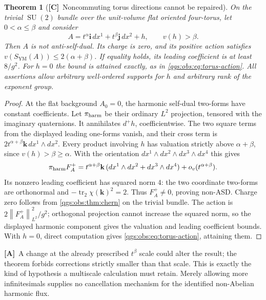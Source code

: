 \documentclass[11pt,oneside]{article}
\numberwithin{equation}{section}
\theoremstyle{plain}
\newtheorem{theorem}{Theorem}[section]
\theoremstyle{definition}
\theoremstyle{remark}
\newcommand{\qi}{\mathbf i}
\newcommand{\qj}{\mathbf j}
\newcommand{\qk}{\mathbf k}
\newcommand{\SYM}{S_{\mathrm{YM}}}
\DeclareMathOperator{\tr}{tr}
\DeclareMathOperator{\SU}{SU}
\newcommand{\norm}[1]{\left\|#1\right\|}
\newcommand{\TC}{\textcolor{TierC}{\textsf{\bfseries[C]}}}
\newcommand{\TA}{\textcolor{TierA}{\textsf{\bfseries[A]}}}
\begin{document}
\begin{theorem}[\TC\ Noncommuting torus directions cannot be repaired]\label{qgs:obs:thm:torus-obstruction}
On the trivial $\SU(2)$ bundle over the unit-volume flat oriented four-torus, let $0<\alpha\le\beta$ and consider
\begin{equation}\label{qgs:obs:eq:torus-tail}
 A=t^\alpha \qi\,dx^1+t^\beta \qj\,dx^2+h,
 \qquad v(h)>\beta.
\end{equation}
Then $A$ is not anti-self-dual. Its charge is zero, and its positive action satisfies $v(\SYM(A))\le2(\alpha+\beta)$. If equality holds, its leading coefficient is at least $8/g^2$. For $h=0$ the bound is attained exactly, as in \eqref{qgs:obs:eq:torus-action}. All assertions allow arbitrary well-ordered supports for $h$ and arbitrary rank of the exponent group.
\end{theorem}
\begin{proof}
At the flat background $A_0=0$, the harmonic self-dual two-forms have constant coefficients. Let $\pi_{\rm harm}$ be their ordinary $L^2$ projection, tensored with the imaginary quaternions. It annihilates $d^+h$, coefficientwise. The two square terms from the displayed leading one-forms vanish, and their cross term is $2t^{\alpha+\beta}\qk\,dx^1\wedge dx^2$. Every product involving $h$ has valuation strictly above $\alpha+\beta$, since $v(h)>\beta\ge\alpha$. With the orientation $dx^1\wedge dx^2\wedge dx^3\wedge dx^4$ this gives
\begin{equation}
 \pi_{\rm harm}F_A^+
 =t^{\alpha+\beta}\qk\,(dx^1\wedge dx^2+dx^3\wedge dx^4)
       +o_v(t^{\alpha+\beta}).
\end{equation}
Its nonzero leading coefficient has squared norm $4$: the two coordinate two-forms are orthonormal and $-\tr_2\chi(\qk)^2=2$. Thus $F_A^+\ne0$, proving non-ASD. Charge zero follows from \cref{qgs:obs:thm:chern} on the trivial bundle. The action is $2\norm{F_A^+}_{L^2}^2/g^2$; orthogonal projection cannot increase the squared norm, so the displayed harmonic component gives the valuation and leading coefficient bounds. With $h=0$, direct computation gives \eqref{qgs:obs:eq:torus-action}, attaining them.
\end{proof}

\TA\ A change at the already prescribed $t^\beta$ scale could alter the result; the theorem forbids corrections strictly smaller than that scale. This is exactly the kind of hypothesis a multiscale calculation must retain. Merely allowing more infinitesimals supplies no cancellation mechanism for the identified non-Abelian harmonic flux.
\end{document}
